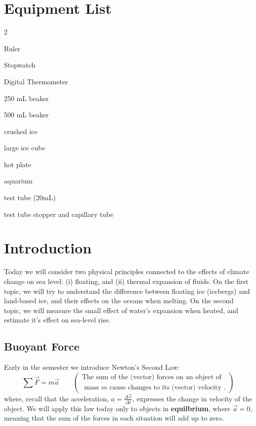 

\section*{Equipment List}

\begin{multicols}{2}   %
\begin{equipment}
\item Ruler
\item Stopwatch
\item Digital Thermometer
\item 250 mL beaker
\item 500 mL beaker
\item crushed ice
\item large ice cube
\item hot plate
\item aquarium
\item test tube (20mL)
\item test tube stopper and capillary tube
\end{equipment}
\end{multicols}


\section{Introduction}

Today we will consider two physical principles connected to the effects of climate change on sea level: (i) floating, and (ii) thermal expansion of fluids.  On the first topic, we will try to understand the difference between floating ice (icebergs) and land-based ice, and their effects on the oceans when melting.  On the second topic, we will measure the small effect of water's expansion when heated, and estimate it's effect on sea-level rise.

\subsection{Buoyant Force}

Early in the semester we introduce Newton's Second Law:
	\begin{equation*}
	\sum \vec{F} = m \vec{a} \quad \quad 
	\left(
	\begin{array} {c}
	 \text{The sum of the (vector) forces on an object of} \\
	\text{ mass $m$ cause changes to its (vector) velocity }.
	\end{array}
	\right)
	\end{equation*}
where, recall that the acceleration, $a = \frac{\Delta \vec{v}}{\Delta t}$, expresses the change in velocity of the object. We will apply this law today only to objects in {\bf equilbrium}, where $\vec{a} = 0$, meaning that the sum of the forces in each situation will add up to zero.  

